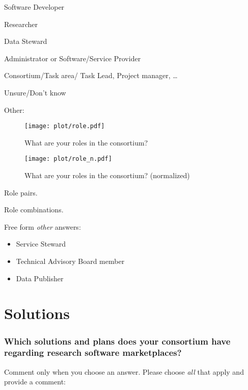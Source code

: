 \documentclass[headsepline,titlepage,twoside,12pt,toc=flat,headings=normal]{scrreprt}
\newcommand{\question}[1]{\subsubsection{#1}}
\newcommand{\otherbox}{\fbox{\phantom{This is how big an answer would be.}}}
\begin{document}
\begin{answers}
\item Software Developer
\item Researcher
\item Data Steward
\item Administrator or Software/Service Provider
\item Consortium/Task area/ Task Lead, Project manager, \ldots{}
\item Unsure/Don't know
\item Other: \otherbox
\end{answers}

\begin{figure}[h!]
\caption{What are your roles in the consortium?}
\label{fig:role}
\texttt{[image: plot/role.pdf]}
\end{figure}

\begin{figure}[h!]
\caption{What are your roles in the consortium? (normalized)}
\label{fig:role_n}
\texttt{[image: plot/role\_n.pdf]}
\end{figure}

\begin{table}
\caption{Role pairs.}
\label{tab:role_pairs}

\end{table}

\begin{table}
\caption{Role combinations.}
\label{tab:role_combinations}

\end{table}

Free form \emph{other} answers:
\begin{itemize}
\item Service Steward
\item Technical Advisory Board member
\item Data Publisher
\end{itemize}

\section{Solutions}
\question{Which solutions and plans does your consortium have regarding research software marketplaces?}

Comment only when you choose an answer.
Please choose \emph{all} that apply and provide a comment:
\end{document}

